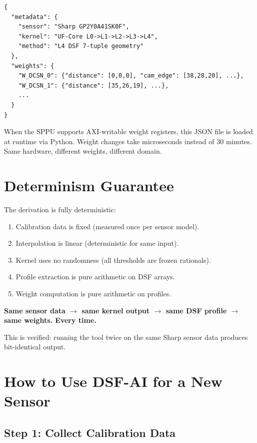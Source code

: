 \documentclass[11pt,a4paper]{article}
\begin{document}
\begin{lstlisting}
{
  "metadata": {
    "sensor": "Sharp GP2Y0A41SK0F",
    "kernel": "UF-Core L0->L1->L2->L3->L4",
    "method": "L4 DSF 7-tuple geometry"
  },
  "weights": {
    "W_DCSN_0": {"distance": [0,0,0], "cam_edge": [38,28,20], ...},
    "W_DCSN_1": {"distance": [35,26,19], ...},
    ...
  }
}
\end{lstlisting}

When the SPPU supports AXI-writable weight registers, this JSON
file is loaded at runtime via Python. Weight changes take
microseconds instead of 30 minutes. Same hardware, different
weights, different domain.

\section{Determinism Guarantee}

The derivation is fully deterministic:

\begin{enumerate}[nosep]
\item Calibration data is fixed (measured once per sensor model).
\item Interpolation is linear (deterministic for same input).
\item Kernel uses no randomness (all thresholds are frozen rationals).
\item Profile extraction is pure arithmetic on DSF arrays.
\item Weight computation is pure arithmetic on profiles.
\end{enumerate}

\textbf{Same sensor data $\rightarrow$ same kernel output $\rightarrow$
same DSF profile $\rightarrow$ same weights. Every time.}

This is verified: running the tool twice on the same Sharp sensor
data produces bit-identical output.

\section{How to Use DSF-AI for a New Sensor}

\subsection{Step 1: Collect Calibration Data}
\end{document}
